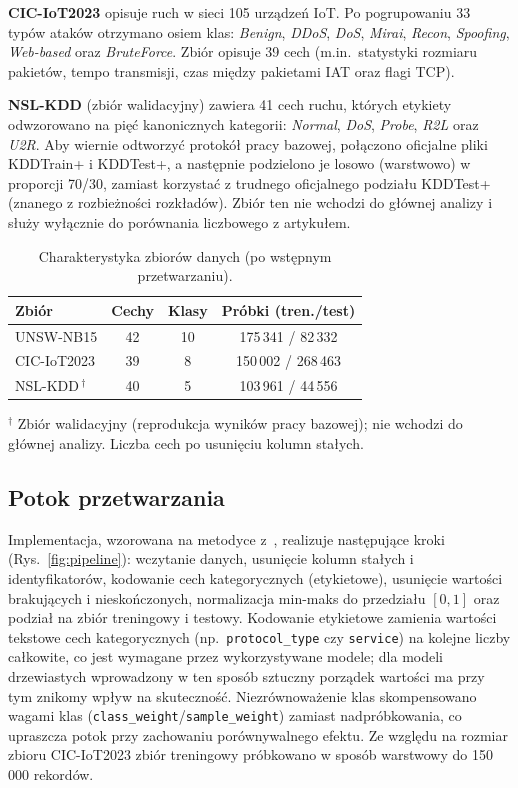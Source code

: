 \documentclass[conference]{IEEEtran}
\begin{document}
\textbf{CIC-IoT2023} opisuje ruch w sieci 105 urządzeń IoT. Po pogrupowaniu 33 typów ataków otrzymano osiem klas: \emph{Benign}, \emph{DDoS}, \emph{DoS}, \emph{Mirai}, \emph{Recon}, \emph{Spoofing}, \emph{Web-based} oraz \emph{BruteForce}. Zbiór opisuje 39 cech (m.in.\ statystyki rozmiaru pakietów, tempo transmisji, czas między pakietami IAT oraz flagi TCP).

\textbf{NSL-KDD} (zbiór walidacyjny) zawiera 41 cech ruchu, których etykiety odwzorowano na pięć kanonicznych kategorii: \emph{Normal}, \emph{DoS}, \emph{Probe}, \emph{R2L} oraz \emph{U2R}. Aby wiernie odtworzyć protokół pracy bazowej, połączono oficjalne pliki KDDTrain+ i KDDTest+, a następnie podzielono je losowo (warstwowo) w proporcji 70/30, zamiast korzystać z trudnego oficjalnego podziału KDDTest+ (znanego z rozbieżności rozkładów). Zbiór ten nie wchodzi do głównej analizy i służy wyłącznie do porównania liczbowego z artykułem.

\begin{table}[t]
\caption{Charakterystyka zbiorów danych (po wstępnym przetwarzaniu).}
\label{tab:datasets}
\centering
\begin{tabular}{lccc}
\toprule
Zbiór & Cechy & Klasy & Próbki (tren./test) \\
\midrule
UNSW-NB15   & 42 & 10 & 175\,341 / 82\,332 \\
CIC-IoT2023 & 39 & 8  & 150\,002 / 268\,463 \\
\midrule
NSL-KDD\,$^\dagger$ & 40 & 5 & 103\,961 / 44\,556 \\
\bottomrule
\end{tabular}

\vspace{2pt}
\footnotesize $^\dagger$ Zbiór walidacyjny (reprodukcja wyników pracy bazowej); nie wchodzi do głównej analizy. Liczba cech po usunięciu kolumn stałych.
\end{table}

\subsection{Potok przetwarzania}
Implementacja, wzorowana na metodyce z~\cite{arreche2024xaiids}, realizuje następujące kroki (Rys.~\ref{fig:pipeline}): wczytanie danych, usunięcie kolumn stałych i identyfikatorów, kodowanie cech kategorycznych (etykietowe), usunięcie wartości brakujących i nieskończonych, normalizacja min-maks do przedziału $[0,1]$ oraz podział na zbiór treningowy i testowy. Kodowanie etykietowe zamienia wartości tekstowe cech kategorycznych (np.\ \texttt{protocol\_type} czy \texttt{service}) na kolejne liczby całkowite, co jest wymagane przez wykorzystywane modele; dla modeli drzewiastych wprowadzony w ten sposób sztuczny porządek wartości ma przy tym znikomy wpływ na skuteczność. Niezrównoważenie klas skompensowano wagami klas (\texttt{class\_weight}/\texttt{sample\_weight}) zamiast nadpróbkowania, co upraszcza potok przy zachowaniu porównywalnego efektu. Ze względu na rozmiar zbioru CIC-IoT2023 zbiór treningowy próbkowano w sposób warstwowy do 150\,000 rekordów.
\end{document}
